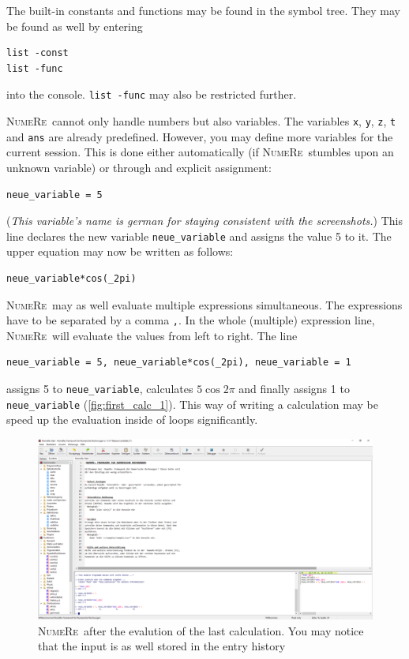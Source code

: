 \documentclass[DIV=14,headsepline,footsepline]{scrbook}
\newcommand{\NR}{\textsc{Nu\-me\-Re}}
\begin{document}
				The built-in constants and functions may be found in the symbol tree. They may be found as well by entering 
				\begin{lstlisting}
list -const
list -func
				\end{lstlisting}
				into the console. \verb+list -func+ may also be restricted further.
				
				\NR\ cannot only handle numbers but also variables. The variables \verb+x+, \verb+y+, \verb+z+, \verb+t+ and \verb+ans+ are already predefined. However, you may define more variables for the current session. This is done either automatically (if \NR\ stumbles upon an unknown variable) or through and explicit assignment:
				\begin{lstlisting}
neue_variable = 5
				\end{lstlisting}
				(\emph{This variable's name is german for staying consistent with the screenshots.}) This line declares the new variable \verb+neue_variable+ and assigns the value 5 to it. The upper equation may now be written as follows:
				\begin{lstlisting}
neue_variable*cos(_2pi)
				\end{lstlisting}
				
				\NR\ may as well evaluate multiple expressions simultaneous. The expressions have to be separated by a comma \verb+,+. In the whole (multiple) expression line, \NR\ will evaluate the values from left to right. The line
				\begin{lstlisting}
neue_variable = 5, neue_variable*cos(_2pi), neue_variable = 1
				\end{lstlisting}
				assigns 5 to \verb+neue_variable+, calculates $5\cos2\pi$ and finally assigns 1 to \verb+neue_variable+ (\autoref{fig:first_calc_1}). This way of writing a calculation may be speed up the evaluation inside of loops significantly.
				
				\begin{figure}[htb]%
					\centering
					\includegraphics[width=\textwidth]{_graphics/first_calc_1.png}
					\caption{\NR\ after the evalution of the last calculation. You may notice that the input is as well stored in the entry history}
					\label{fig:first_calc_1}
				\end{figure}
\end{document}
